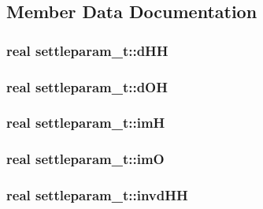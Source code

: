 \subsection{\-Member \-Data \-Documentation}
\hypertarget{structsettleparam__t_a821ef319b1fb240752555951695abff3}{
\subsubsection[{d\-H\-H}]{\setlength{\rightskip}{0pt plus 5cm}real {\bf settleparam\-\_\-t\-::d\-H\-H}}}\label{structsettleparam__t_a821ef319b1fb240752555951695abff3}
\hypertarget{structsettleparam__t_ac46c91ecaa9458c9d1b5b40e256bbbe3}{
\subsubsection[{d\-O\-H}]{\setlength{\rightskip}{0pt plus 5cm}real {\bf settleparam\-\_\-t\-::d\-O\-H}}}\label{structsettleparam__t_ac46c91ecaa9458c9d1b5b40e256bbbe3}
\hypertarget{structsettleparam__t_abbae60abfbee7f3a89899495dd773de5}{
\subsubsection[{im\-H}]{\setlength{\rightskip}{0pt plus 5cm}real {\bf settleparam\-\_\-t\-::im\-H}}}\label{structsettleparam__t_abbae60abfbee7f3a89899495dd773de5}
\hypertarget{structsettleparam__t_a9ad8f7955e9937a7f2e672d2d3c95b4b}{
\subsubsection[{im\-O}]{\setlength{\rightskip}{0pt plus 5cm}real {\bf settleparam\-\_\-t\-::im\-O}}}\label{structsettleparam__t_a9ad8f7955e9937a7f2e672d2d3c95b4b}
\hypertarget{structsettleparam__t_af8b3c0b867a6a52e2ae72d7a9a4c4616}{
\subsubsection[{invd\-H\-H}]{\setlength{\rightskip}{0pt plus 5cm}real {\bf settleparam\-\_\-t\-::invd\-H\-H}}}\label{structsettleparam__t_af8b3c0b867a6a52e2ae72d7a9a4c4616}
